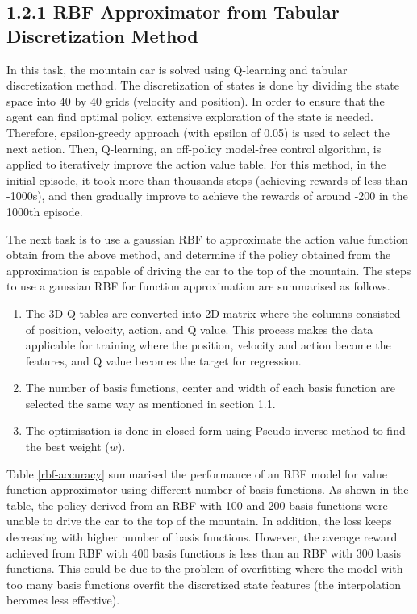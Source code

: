 \documentclass[12pt,letterpaper]{article}
\newenvironment{myitemize}
{ \begin{enumerate}
    \setlength{\itemsep}{1pt}
    \setlength{\parskip}{1pt}
    \setlength{\parsep}{1pt}     }
{ \end{enumerate}         }
\begin{document}
\subsection*{1.2.1 RBF Approximator from Tabular Discretization Method}

In this task, the mountain car is solved using Q-learning and tabular discretization method. 
The discretization of states is done by dividing the state space into 40 by 40 grids (velocity and position). 
In order to ensure that the agent can find optimal policy, extensive exploration of the state is needed.
Therefore, epsilon-greedy approach (with epsilon of 0.05) is used to select the next action.
Then, Q-learning, an off-policy model-free control algorithm, is applied to iteratively improve the action value table.
For this method, in the initial episode, it took more than thousands steps (achieving rewards of less than -1000s), 
and then gradually improve to achieve the rewards of around -200 in the 1000th episode. 

The next task is to use a gaussian RBF to approximate the action value function obtain from the above method, 
and determine if the policy obtained from the approximation is capable of driving the car to the top of the mountain.
The steps to use a gaussian RBF for function approximation are summarised as follows.

\vspace{-1em}
\begin{myitemize}
  \item The 3D Q tables are converted into 2D matrix where the columns consisted of position, velocity, action, and Q value.
        This process makes the data applicable for training where the position, velocity and action become the features, 
        and Q value becomes the target for regression.
  \item The number of basis functions, center and width of each basis function are selected the same way as mentioned in section 1.1.
  \item The optimisation is done in closed-form using Pseudo-inverse method to find the best weight ($w$).
\end{myitemize}    
\vspace{-1em}
Table \ref{rbf-accuracy} summarised the performance of an RBF model for value function approximator using different number of basis functions.
As shown in the table, the policy derived from an RBF with 100 and 200 basis functions were unable to drive the car to the top of the mountain.
In addition, the loss keeps decreasing with higher number of basis functions.
However, the average reward achieved from RBF with 400 basis functions is less than an RBF with 300 basis functions.
This could be due to the problem of overfitting where the model with too many basis functions overfit the discretized state features (the interpolation becomes less effective).
\end{document}
